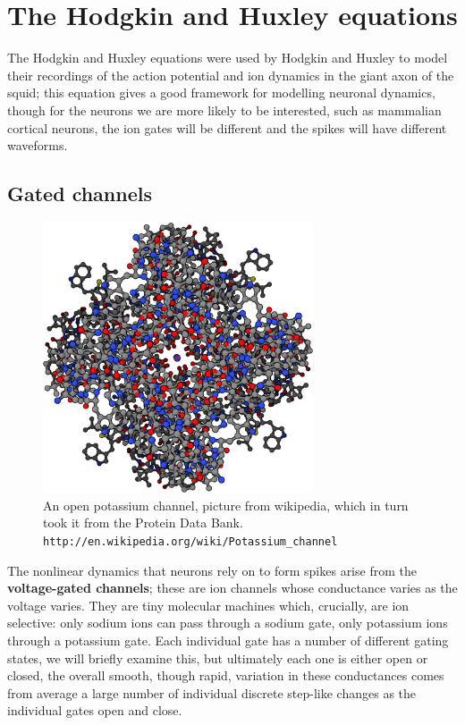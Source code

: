 \documentclass{article}
\begin{document}
\section*{The Hodgkin and Huxley equations}

The Hodgkin and Huxley equations were used by Hodgkin and Huxley to
model their recordings of the action potential and ion dynamics in the
giant axon of the squid; this equation gives a good framework for
modelling neuronal dynamics, though for the neurons we are more likely
to be interested, such as mammalian cortical neurons, the ion gates
will be different and the spikes will have different waveforms.

\subsection*{Gated channels}

\begin{figure}
\begin{center}
\includegraphics[width=8cm]{potassium_channel.png}
\end{center}
\caption{An open potassium channel, picture from  wikipedia, which in turn took it from the Protein Data Bank. \texttt{http://en.wikipedia.org/wiki/Potassium\_channel}}
\end{figure}

The nonlinear dynamics that neurons rely on to form spikes arise from
the \textbf{voltage-gated channels}; these are ion channels whose
conductance varies as the voltage varies. They are tiny molecular
machines which, crucially, are ion selective: only sodium ions can
pass through a sodium gate, only potassium ions through a potassium
gate. Each individual gate has a number of different gating states, we
will briefly examine this, but ultimately each one is either open or
closed, the overall smooth, though rapid, variation in these
conductances comes from average a large number of individual discrete
step-like changes as the individual gates open and close.
\end{document}
